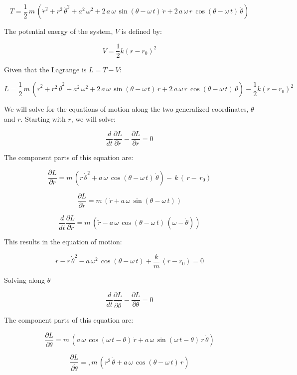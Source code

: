 \documentclass[12pt, letterpaper]{../assignment}
\begin{document}
$$ T = \frac{1}{2}\,m\,\left({\dot{r}}^2+{r}^2\,{\dot{\theta}}^2+a^2\,\omega ^2+2\,a\,\omega \,\sin\left(\theta -\omega \,t\right)\,\dot{r}+2\,a\,\omega \,r\,\cos\left(\theta -\omega \,t\right)\,\dot{\theta} \right)  $$

The potential energy of the system, $V$ is defined by:

$$ V = \frac{1}{2}k\left( r - r_0 \right)^2 $$


Given that the Lagrange is $ L = T - V $:

$$ L = \frac{1}{2}\,m\,\left({\dot{r}}^2+{r}^2\,{\dot{\theta}}^2+a^2\,\omega ^2+2\,a\,\omega \,\sin\left(\theta -\omega \,t\right)\,\dot{r}+2\,a\,\omega \,r\,\cos\left(\theta -\omega \,t\right)\,\dot{\theta} \right)
- \frac{1}{2}k\left( r - r_0 \right)^2  $$

We will solve for the equations of motion along the two generalized coordinates, $\theta$ and $r$.
Starting with $r$, we will solve:

$$ \frac{d}{d t} \frac{\partial L}{\partial \dot{r}} - \frac{\partial L}{\partial r} = 0 $$

The component parts of this equation are:

$$ \frac{\partial L}{\partial r} = 
m\,\left(r\,{\dot{\theta} }^2+a\,\omega \,\cos\left(\theta -\omega \,t\right)\,\dot{\theta} \right) -\,k\,\left(\,r-\,r_{0}\right) $$

$$ \frac{\partial L}{\partial \dot{r}}  =
m\,\left(\dot{r}+a\,\omega \,\sin\left(\theta -\omega \,t\right)\right) $$

$$ \frac{d}{d t} \frac{\partial L}{\partial \dot{r}} =
m\,\left(\ddot{r}-a\,\omega \,\cos\left(\theta -\omega \,t\right)\,\left(\omega -\dot{\theta} \right)\right) $$

This results in the equation of motion:

$$ \ddot{r}-r\,{\dot{\theta} }^2-a\,\omega ^2\,\cos\left(\theta -\omega \,t\right) + \frac{k}{m}\,(r-r_{0}) = 0 $$

Solving along $\theta$

$$ \frac{d}{d t} \frac{\partial L}{\partial \dot{\theta}} - \frac{\partial L}{\partial \theta} = 0 $$

The component parts of this equation are:

$$ \frac{\partial L}{\partial \theta} = 
m\,\left(a\,\omega \,\cos\left(\omega \,t-\theta \right)\,\dot{r}+a\,\omega \,\sin\left(\omega \,t-\theta \right)\,r\,\dot{\theta} \right) $$

$$ \frac{\partial L}{\partial \dot{\theta}}  =
,m\,\left({r}^2\,\dot{\theta} +a\,\omega \,\cos\left(\theta -\omega \,t\right)\,r\right) $$
\end{document}
